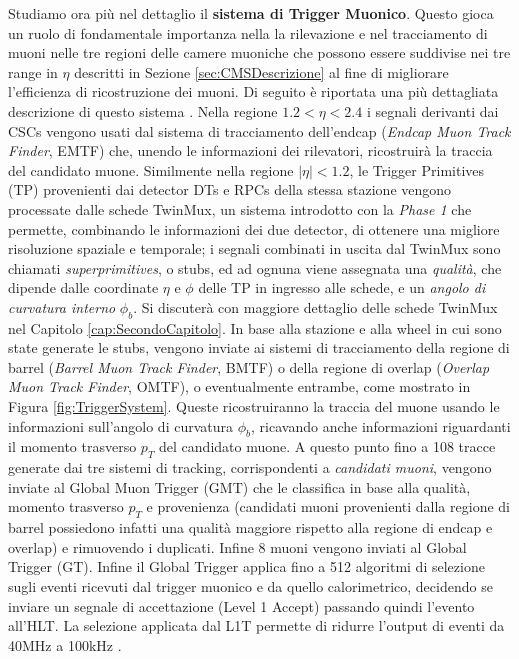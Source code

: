 Studiamo ora più nel dettaglio il \textbf{sistema di Trigger Muonico}. Questo gioca un ruolo di fondamentale importanza nella la rilevazione e nel tracciamento di muoni nelle tre regioni delle camere muoniche che possono essere suddivise nei tre range in $\eta$ descritti in Sezione \ref{sec:CMSDescrizione} al fine di migliorare l'efficienza di ricostruzione dei muoni. Di seguito è riportata una più dettagliata descrizione di questo sistema \cite{sirunyan2020performance}.\newline
Nella regione $1.2 < \eta < 2.4$ i segnali derivanti dai CSCs vengono usati dal sistema di tracciamento dell'endcap (\textit{Endcap Muon Track Finder}, EMTF) che, unendo le informazioni dei rilevatori, ricostruirà la traccia del candidato muone.\newline
Similmente nella regione $|\eta| < 1.2$, le Trigger Primitives (TP) provenienti dai detector DTs e RPCs della stessa stazione vengono processate dalle schede TwinMux, un sistema introdotto con la \textit{Phase 1} che permette, combinando le informazioni dei due detector, di ottenere una migliore risoluzione spaziale e temporale; i segnali combinati in uscita dal TwinMux sono chiamati \textit{superprimitives}, o stubs, ed ad ognuna viene assegnata una \textit{qualità}, che dipende dalle coordinate $\eta$ e $\phi$ delle TP in ingresso alle schede, e un \textit{angolo di curvatura interno} $\phi_b$. 
Si discuterà con maggiore dettaglio delle schede TwinMux nel Capitolo \ref{cap:SecondoCapitolo}. In base alla stazione e alla wheel in cui sono state generate le stubs, vengono inviate ai sistemi di tracciamento della regione di barrel (\textit{Barrel Muon Track Finder}, BMTF) o della regione di overlap (\textit{Overlap Muon Track Finder}, OMTF), o eventualmente entrambe, come mostrato in Figura \ref{fig:TriggerSystem}. Queste  ricostruiranno la traccia del muone usando le informazioni sull'angolo di curvatura $\phi_b$, ricavando anche informazioni riguardanti il momento trasverso $p_T$ del candidato muone. \newline
A questo punto fino a 108 tracce generate dai tre sistemi di tracking, corrispondenti a \textit{candidati muoni}, vengono inviate al Global Muon Trigger (GMT) che le classifica in base alla qualità, momento trasverso $p_T$ e provenienza (candidati muoni provenienti dalla regione di barrel possiedono infatti una qualità maggiore rispetto alla regione di endcap e overlap) e rimuovendo i duplicati. Infine 8 muoni vengono inviati al Global Trigger (GT). \newline
Infine il Global Trigger applica fino a 512 algoritmi di selezione sugli eventi ricevuti dal trigger muonico e da quello calorimetrico, decidendo se inviare un segnale di accettazione (Level 1 Accept) passando quindi l'evento all'HLT. La selezione applicata dal L1T permette di ridurre l'output di eventi da 40MHz a 100kHz \cite{CERNsummerSchool}.\newline
